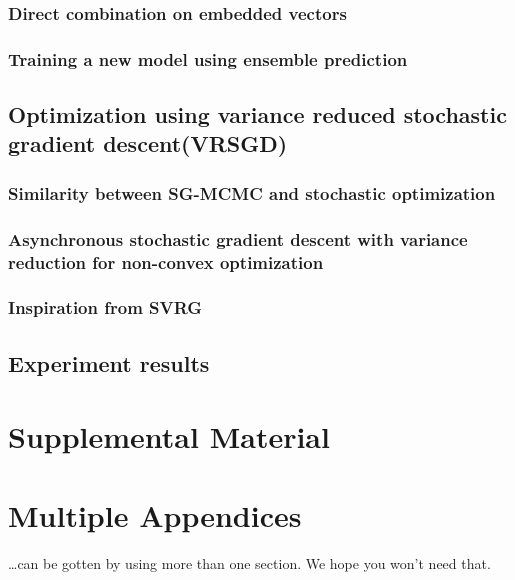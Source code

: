 \documentclass[11pt,a4paper]{article}
\begin{document}
\subsubsection{Direct combination on embedded vectors}
\subsubsection{Training a new model using ensemble prediction}

\subsection{Optimization using variance reduced stochastic gradient descent(VRSGD)}
\subsubsection{Similarity between SG-MCMC and stochastic optimization}
\subsubsection{Asynchronous stochastic gradient descent with variance reduction for non-convex optimization}
\subsubsection{Inspiration from SVRG}
\subsection{Experiment results}




\appendix

\section{Supplemental Material}
\label{sec:supplemental}

\section{Multiple Appendices}
\dots can be gotten by using more than one section. We hope you won't
need that.
\end{document}
